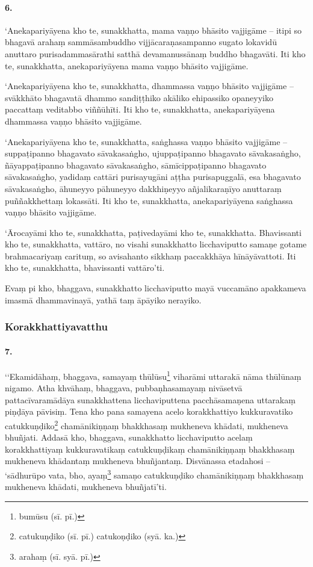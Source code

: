 \paragraph{6.} ‘Anekapariyāyena kho te, sunakkhatta, mama vaṇṇo bhāsito vajjigāme – itipi so bhagavā arahaṃ sammāsambuddho vijjācaraṇasampanno sugato lokavidū anuttaro purisadammasārathi satthā devamanussānaṃ buddho bhagavāti. Iti kho te, sunakkhatta, anekapariyāyena mama vaṇṇo bhāsito vajjigāme.

‘Anekapariyāyena kho te, sunakkhatta, dhammassa vaṇṇo bhāsito vajjigāme – svākkhāto bhagavatā dhammo sandiṭṭhiko akāliko ehipassiko opaneyyiko paccattaṃ veditabbo viññūhīti. Iti kho te, sunakkhatta, anekapariyāyena dhammassa vaṇṇo bhāsito vajjigāme.

‘Anekapariyāyena kho te, sunakkhatta, saṅghassa vaṇṇo bhāsito vajjigāme – suppaṭipanno bhagavato sāvakasaṅgho, ujuppaṭipanno bhagavato sāvakasaṅgho, ñāyappaṭipanno bhagavato sāvakasaṅgho, sāmīcippaṭipanno bhagavato sāvakasaṅgho, yadidaṃ cattāri purisayugāni aṭṭha purisapuggalā, esa bhagavato sāvakasaṅgho, āhuneyyo pāhuneyyo dakkhiṇeyyo añjalikaraṇīyo anuttaraṃ puññakkhettaṃ lokassāti. Iti kho te, sunakkhatta, anekapariyāyena saṅghassa vaṇṇo bhāsito vajjigāme.

‘Ārocayāmi kho te, sunakkhatta, paṭivedayāmi kho te, sunakkhatta. Bhavissanti kho te, sunakkhatta, vattāro, no visahi sunakkhatto licchaviputto samaṇe gotame brahmacariyaṃ carituṃ, so avisahanto sikkhaṃ paccakkhāya hīnāyāvattoti. Iti kho te, sunakkhatta, bhavissanti vattāro’ti.

Evaṃ pi kho, bhaggava, sunakkhatto licchaviputto mayā vuccamāno apakkameva imasmā dhammavinayā, yathā taṃ āpāyiko nerayiko.

\subsubsection{Korakkhattiyavatthu}

\paragraph{7.} ‘‘Ekamidāhaṃ, bhaggava, samayaṃ thūlūsu\footnote{bumūsu (sī. pī.)} viharāmi uttarakā nāma thūlūnaṃ nigamo. Atha khvāhaṃ, bhaggava, pubbaṇhasamayaṃ nivāsetvā pattacīvaramādāya sunakkhattena licchaviputtena pacchāsamaṇena uttarakaṃ piṇḍāya pāvisiṃ. Tena kho pana samayena acelo korakkhattiyo kukkuravatiko catukkuṇḍiko\footnote{catukuṇḍiko (sī. pī.) catukoṇḍiko (syā. ka.)} chamānikiṇṇaṃ bhakkhasaṃ mukheneva khādati, mukheneva bhuñjati. Addasā kho, bhaggava, sunakkhatto licchaviputto acelaṃ korakkhattiyaṃ kukkuravatikaṃ catukkuṇḍikaṃ chamānikiṇṇaṃ bhakkhasaṃ mukheneva khādantaṃ mukheneva bhuñjantaṃ. Disvānassa etadahosi – ‘sādhurūpo vata, bho, ayaṃ\footnote{arahaṃ (sī. syā. pī.)} samaṇo catukkuṇḍiko chamānikiṇṇaṃ bhakkhasaṃ mukheneva khādati, mukheneva bhuñjatī’ti.

